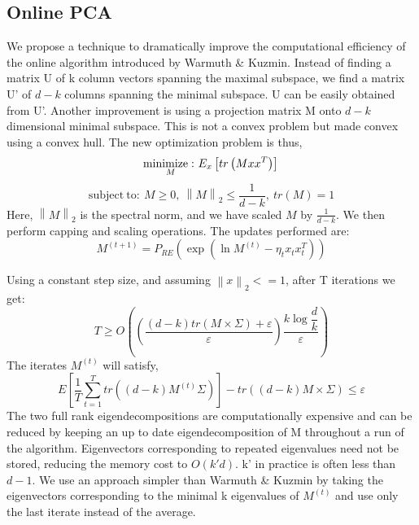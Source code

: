\documentclass{article}
\begin{document}
\subsection{Online PCA}
We propose a technique to dramatically improve the computational efficiency of the online algorithm introduced by Warmuth \& Kuzmin. Instead of finding a matrix U of k column vectors spanning the maximal subspace, we find a matrix U’ of $d - k$ columns spanning the minimal subspace. U can be easily obtained from U’. Another improvement is using a projection matrix M onto $d - k$ dimensional minimal subspace. This is not a convex problem but made convex using a convex hull. The new optimization problem is thus, 
\begin{equation}
\underset{M}{\mathrm{minimize :\ }}{E}_{x}\left[ tr\left( Mxx^{T}\right)\right] \\
\end{equation}
\begin{equation}
\mathrm{subject\ to :\ }M\geq 0,\ \left\| M\right\| _{2}\leq \dfrac {1}{d-k},\ tr\left( M\right) =1
\end{equation}
Here, $\left\| M\right\| _{2}$ is the spectral norm, and we have scaled $M$ by $\frac{1}{d-k}$. We then perform capping and scaling operations. The updates performed are:
\begin{equation}\label{eq:7}
    M^{\left( t+1\right) }=P_{RE}\left( \exp \left( \ln M^{\left( t\right) }-\eta _{t}x_{t}x^{T}_{t}\right) \right) 
\end{equation}

Using a constant step size, and assuming $\left\| x\right\| _{2} <=1$, after T iterations we get:
\begin{equation}
    T\geq O\left( \left( \dfrac {\left( d-k\right) tr\left( M\times \Sigma \right) +\varepsilon }{\varepsilon }\right) \dfrac {k\log \dfrac {d}{k}}{\varepsilon }\right) 
\end{equation}
The iterates $M^{(t)}$ will satisfy,
\begin{equation}
    E\left[ \dfrac {1}{T}\sum ^{T}_{t=1}tr\left( \left( d-k\right) M^{\left( t\right) }\Sigma \right) \right] -tr\left( \left( d-k\right) M\times \Sigma \right) \leq \varepsilon 
\end{equation}
The two full rank eigendecompositions are computationally expensive and can be reduced by keeping an up to date eigendecomposition of M throughout a run of the algorithm.
Eigenvectors corresponding to repeated eigenvalues need not be stored, reducing the memory cost to $O\left( k'd\right)$. k’ in practice is often less than $d-1$. We use an approach simpler than Warmuth \& Kuzmin by taking the eigenvectors corresponding to the minimal k eigenvalues of $M^{(t)}$ and use only the last iterate instead of the average.
\end{document}
